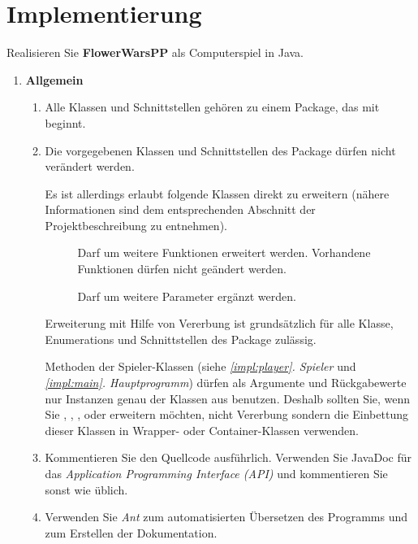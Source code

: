 \section*{Implementierung}

Realisieren Sie \textbf{FlowerWarsPP} als Computerspiel in Java.

\begin{enumerate}
\item \textbf{Allgemein}

\begin{enumerate}
\item
Alle Klassen und Schnittstellen gehören zu einem Package, das mit  beginnt.
\item
Die vorgegebenen Klassen und Schnittstellen des Package  dürfen nicht verändert werden. 

Es ist allerdings erlaubt folgende Klassen direkt zu erweitern (nähere Informationen sind dem entsprechenden Abschnitt der Projektbeschreibung zu entnehmen).
\begin{description}
\item[] Darf um weitere Funktionen erweitert werden. Vorhandene Funktionen dürfen nicht geändert werden.
\item[] Darf um weitere Parameter ergänzt werden.
\end{description}

Erweiterung mit Hilfe von Vererbung ist grundsätzlich für alle Klasse, Enumerations und Schnittstellen des Package 
 zulässig. 

Methoden der Spieler-Klassen (siehe \textit{\ref{impl:player}. Spieler}
und \textit{\ref{impl:main}. Hauptprogramm})
dürfen als Argumente und Rückgabewerte nur Instanzen genau der Klassen aus 
 benutzen. Deshalb sollten Sie, wenn Sie
,
,
,
oder 
erweitern möchten, nicht Vererbung sondern die Einbettung dieser Klassen in Wrapper-
oder Container-Klassen verwenden.

\item Kommentieren Sie den Quellcode ausführlich.
Verwenden Sie JavaDoc für das \emph{Application Programming Interface (API)} und kommentieren Sie sonst wie üblich.

\item Verwenden Sie \emph{Ant} zum automatisierten Übersetzen des Programms und zum Erstellen der Dokumentation.


\end{enumerate}
\end{enumerate}
